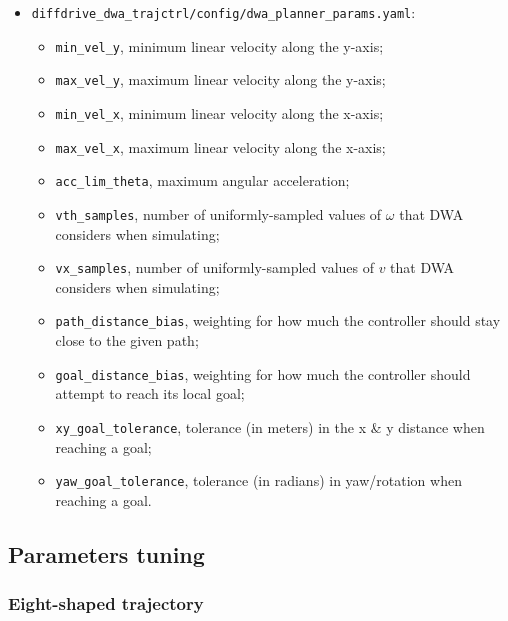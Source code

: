 \documentclass[11pt,a4paper]{article}
\begin{document}
\begin{itemize}
    \item \texttt{diffdrive\_dwa\_trajctrl/config/dwa\_planner\_params.yaml}:
        \begin{itemize}
            \item \texttt{min\_vel\_y}, minimum linear velocity along the y-axis;
            \item \texttt{max\_vel\_y}, maximum linear velocity along the y-axis;
            \item \texttt{min\_vel\_x}, minimum linear velocity along the x-axis;
            \item \texttt{max\_vel\_x}, maximum linear velocity along the x-axis;
            \item \texttt{acc\_lim\_theta}, maximum angular acceleration;
            \item \texttt{vth\_samples}, number of uniformly-sampled values of $\omega$ that DWA considers when simulating;
            \item \texttt{vx\_samples}, number of uniformly-sampled values of $v$ that DWA considers when simulating;
            \item \texttt{path\_distance\_bias}, weighting for how much the controller should stay close to the given path;
            \item \texttt{goal\_distance\_bias}, weighting for how much the controller should attempt to reach its local goal;
            \item \texttt{xy\_goal\_tolerance}, tolerance (in meters) in the x \& y distance when reaching a goal;
            \item \texttt{yaw\_goal\_tolerance}, tolerance (in radians) in yaw/rotation when reaching a goal.\\
        \end{itemize}

\end{itemize}



\subsection{Parameters tuning}

\subsubsection{Eight-shaped trajectory}
\end{document}
